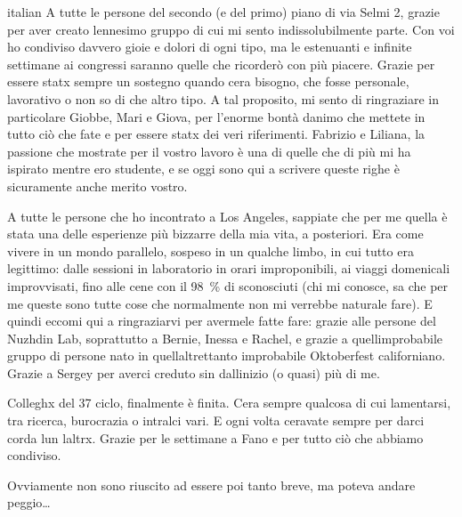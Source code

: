 \begin{otherlanguage*}{italian}
A tutte le persone del secondo (e del primo) piano di via Selmi 2, grazie per aver creato l\curlyapostrophe{}ennesimo gruppo di cui mi sento indissolubilmente parte. Con voi ho condiviso davvero gioie e dolori di ogni tipo, ma le estenuanti e infinite settimane ai congressi saranno quelle che ricorderò con più piacere. Grazie per essere statx sempre un sostegno quando c\curlyapostrophe{}era bisogno, che fosse personale, lavorativo o non so di che altro tipo. A tal proposito, mi sento di ringraziare in particolare Giobbe, Mari e Giova, per l'enorme bontà d\curlyapostrophe{}animo che mettete in tutto ciò che fate e per essere statx dei veri riferimenti. Fabrizio e Liliana, la passione che mostrate per il vostro lavoro è una di quelle che di più mi ha ispirato mentre ero studente, e se oggi sono qui a scrivere queste righe è sicuramente anche merito vostro. 

A tutte le persone che ho incontrato a Los Angeles, sappiate che per me quella è stata una delle esperienze più bizzarre della mia vita, a posteriori. Era come vivere in un mondo parallelo, sospeso in un qualche limbo, in cui tutto era legittimo: dalle sessioni in laboratorio in orari improponibili, ai viaggi domenicali improvvisati, fino alle cene con il \qty{98}{\percent} di sconosciuti (chi mi conosce, sa che per me queste sono tutte cose che normalmente non mi verrebbe naturale fare). E quindi eccomi qui a ringraziarvi per avermele fatte fare: grazie alle persone del Nuzhdin Lab, soprattutto a Bernie, Inessa e Rachel, e grazie a quell\curlyapostrophe{}improbabile gruppo di persone nato in quell\curlyapostrophe{}altrettanto improbabile Oktoberfest californiano. Grazie a Sergey per averci creduto sin dall\curlyapostrophe{}inizio (o quasi) più di me.

Colleghx del 37\textdegree{} ciclo, finalmente è finita. C\curlyapostrophe{}era sempre qualcosa di cui lamentarsi, tra ricerca, burocrazia o intralci vari. E ogni volta c\curlyapostrophe{}eravate sempre per darci corda l\curlyapostrophe{}un l\curlyapostrophe{}altrx. Grazie per le settimane a Fano e per tutto ciò che abbiamo condiviso.

Ovviamente non sono riuscito ad essere poi tanto breve, ma poteva andare peggio\ldots{}
\end{otherlanguage*}